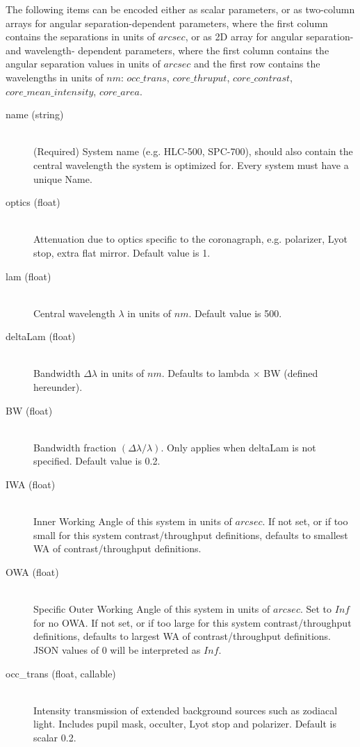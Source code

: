 \documentclass[cleanfoot]{asme2ej}
\begin{document}
\begin{itemize}
\begin{description}
    The following items can be encoded either as scalar parameters, or as two-column arrays for angular separation-dependent parameters, where the first column contains the separations in units of $ arcsec $, or as 2D array for angular separation- and wavelength- dependent parameters, where the first column contains the angular separation values in units of $ arcsec $ and the first row contains the wavelengths in units of $ nm $: $occ\_trans$, $core\_thruput$, $core\_contrast$, $core\_mean\_intensity$, $core\_area$. 
    \begin{description}
        \item[name (string)] \hfill \\ (Required) System name (e.g. HLC-500, SPC-700), should also contain the central wavelength the system is optimized for. Every system must have a unique Name. 
        \item[optics (float)] \hfill \\ Attenuation due to optics specific to the coronagraph, e.g. polarizer, Lyot stop, extra flat mirror. Default value is 1.
        \item[lam (float)] \hfill \\ Central wavelength $\lambda$ in units of $ nm $. Default value is 500. 
        \item[deltaLam (float)] \hfill \\ Bandwidth $ \Delta\lambda $ in units of $ nm $. Defaults to lambda $ \times $ BW (defined hereunder).
        \item[BW (float)] \hfill \\ Bandwidth fraction $(\Delta\lambda/\lambda)$. Only applies when deltaLam is not specified. Default value is 0.2.
        \item[IWA (float)] \hfill \\ Inner Working Angle of this system in units of $ arcsec $. If not set, or if too small for this system contrast/throughput definitions, defaults to smallest WA of contrast/throughput definitions.
        \item[OWA (float)] \hfill \\ Specific Outer Working Angle of this system in units of $ arcsec $. Set to $ Inf $ for no OWA. If not set, or if too large for this system contrast/throughput definitions, defaults to largest WA of contrast/throughput definitions.  JSON values of $ 0 $ will be interpreted as $ Inf $.
        \item[occ\_trans (float, callable)] \hfill \\ Intensity transmission of extended background sources such as zodiacal light. Includes pupil mask, occulter, Lyot stop and polarizer. Default is scalar 0.2.

\end{description}
\end{description}
\end{itemize}
\end{document}
